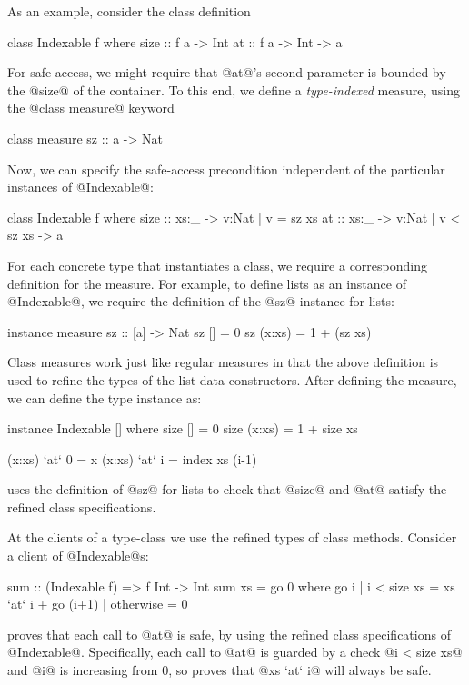 As an example, consider the class definition
%
\begin{code}
  class Indexable f where
    size :: f a -> Int
    at   :: f a -> Int -> a
\end{code}
%
For safe access, we might require that @at@'s second 
parameter is bounded by the @size@ of the container.
To this end, we define a \emph{type-indexed} 
measure, using the @class measure@ keyword
%
\begin{code}
  class measure sz :: a -> Nat
\end{code}
%
Now, we can specify the safe-access precondition  
independent of the particular instances of @Indexable@:
%
\begin{code}
  class Indexable f where
    size :: xs:_ -> {v:Nat | v = sz xs}
    at   :: xs:_ -> {v:Nat | v < sz xs} -> a
\end{code}

For each concrete type that instantiates a class, we require 
a corresponding definition for the measure. 
For example, to define lists as an instance of @Indexable@, 
we require the definition of the @sz@ instance for lists:
%
\begin{code}
  instance measure sz :: [a] -> Nat
  sz []     = 0
  sz (x:xs) = 1 + (sz xs)
\end{code}
%
Class measures work just like regular measures in that the above 
definition is used to refine the types of the list data constructors.
After defining the measure, we can define the type instance as:
%
\begin{code}
  instance Indexable [] where
    size []        = 0
    size (x:xs)    = 1 + size xs

    (x:xs) `at` 0  = x
    (x:xs) `at` i  = index xs (i-1)
\end{code}
%
\toolname uses the definition of @sz@ for lists to check that @size@ 
and @at@ satisfy the refined class specifications. 

At the clients of a type-class we use the refined 
types of class methods. Consider a client of @Indexable@s:
%
\begin{code}
  sum :: (Indexable f) => f Int -> Int
  sum xs = go 0 
    where
      go i | i < size xs = xs `at` i + go (i+1)
           | otherwise   = 0
\end{code}
%
\toolname proves that each call to @at@ is safe, by using the refined
class specifications of @Indexable@. 
Specifically, each call to @at@ is guarded by a check @i < size xs@
and @i@ is  increasing 
from 0, so \toolname proves that @xs `at` i@ will always be safe.

